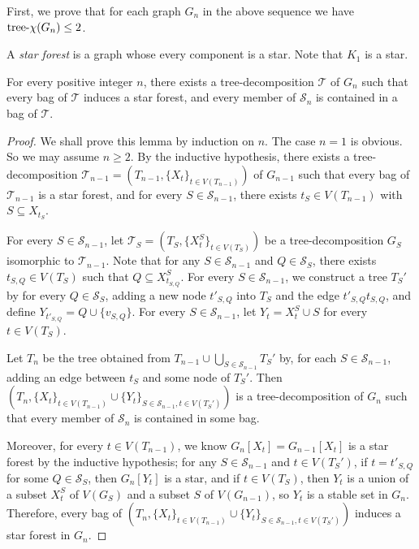 \documentclass[a4paper, cleveref, autoref, thm-restate]{lipics-v2021}
\newcommand{\T}{\mathcal{T}}
\newcommand{\treex}{{\rm tree}\textnormal{-}\chi}
\begin{document}
First, we prove that for each graph $G_n$ in the above sequence we have $\treex(G_n) \leq 2$.

A \emph{star forest} is a graph whose every component is a star.
Note that $K_1$ is a star.

\begin{lemma} \label{lemma:Burling-treex}
For every positive integer $n$, there exists a tree-decomposition \(\mathcal{T}\) of $G_n$ such that every bag of $\T$ induces a star forest, and every member of $\mathcal{S}_n$ is contained in a bag of $\T$. %
\end{lemma}

\begin{proof}
We shall prove this lemma by induction on $n$.
The case $n=1$ is obvious.
So we may assume $n \geq 2$.
By the inductive hypothesis, there exists a tree-decomposition $\T_{n-1}=(T_{n-1},\{X_t\}_{t \in V(T_{n-1})})$ of $G_{n-1}$ such that every bag of $\T_{n-1}$ is a star forest, and for every $S \in \mathcal{S}_{n-1}$, there exists $t_S \in V(T_{n-1})$ with $S \subseteq X_{t_S}$.

For every $S \in \mathcal{S}_{n-1}$, let $\T_S = (T_S, \{X^S_t\}_{t \in V(T_S)})$ be a tree-decomposition $G_{S}$ isomorphic to $\T_{n-1}$. %
Note that for any $S \in {\mathcal S}_{n-1}$ and $Q \in \mathcal{S}_S$, there exists $t_{S,Q} \in V(T_S)$ such that $Q \subseteq X^S_{t_{S,Q}}$.
For every $S \in {\mathcal S}_{n-1}$, we construct a tree $T_S'$ by for every $Q \in {\mathcal S}_S$, adding a new node $t'_{S,Q}$ into $T_S$ and the edge $t'_{S,Q}t_{S,Q}$, and define $Y_{t'_{S,Q}}=Q \cup \{v_{S,Q}\}$.
For every $S \in {\mathcal S}_{n-1}$, let $Y_{t} = X^S_t \cup S$ for every $t \in V(T_S)$.

Let $T_n$ be the tree obtained from $T_{n-1} \cup \bigcup_{S \in \mathcal{S}_{n-1}}T_S'$ by, for each $S \in {\mathcal S}_{n-1}$, adding an edge between $t_S$ and some node of $T_S'$.
Then $(T_n, \{X_t\}_{t \in V(T_{n-1})} \cup \{Y_t\}_{S \in {\mathcal S}_{n-1}, t \in V(T_S')})$ is a tree-decomposition of $G_n$ such that every member of $\mathcal{S}_n$ is contained in some bag.

Moreover, for every $t \in V(T_{n-1})$, we know $G_n[X_t]=G_{n-1}[X_t]$ is a star forest by the inductive hypothesis; for any $S \in {\mathcal S}_{n-1}$ and $t \in V(T_S')$, if $t=t'_{S,Q}$ for some $Q \in \mathcal{S}_S$, then $G_n[Y_t]$ is a star, and if $t \in V(T_S)$, then $Y_t$ is a union of a subset $X^S_t$ of $V(G_S)$ and a subset $S$ of $V(G_{n-1})$, so $Y_t$ is a stable set in $G_n$.
Therefore, every bag of $(T_n, \{X_t\}_{t \in V(T_{n-1})} \cup \{Y_t\}_{S \in {\mathcal S}_{n-1}, t \in V(T_S')})$ induces a star forest in $G_n$.
\end{proof}
\end{document}
